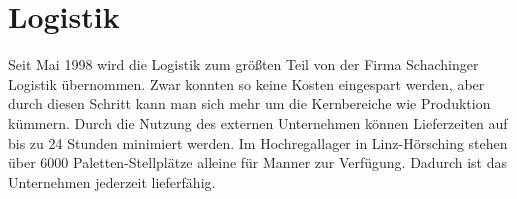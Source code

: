 \section{Logistik}
Seit Mai 1998 wird die Logistik zum größten Teil von der Firma Schachinger Logistik übernommen. Zwar konnten so keine Kosten eingespart werden, aber durch diesen Schritt kann man sich mehr um die Kernbereiche wie Produktion kümmern. Durch die Nutzung des externen Unternehmen können Lieferzeiten auf bis zu 24 Stunden minimiert werden. Im Hochregallager in Linz-Hörsching stehen über 6000 Paletten-Stellplätze alleine für Manner zur Verfügung. Dadurch ist das Unternehmen jederzeit lieferfähig.\cite{wb_outsourcinglogistik}